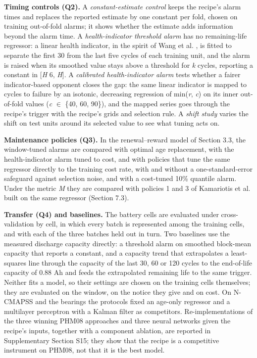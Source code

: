\documentclass[a4paper,fleqn,doubleblind]{cas-dc}
\begin{document}
\textbf{Timing controls (Q2).} A \textit{constant-estimate control} keeps the recipe's alarm times and replaces the reported estimate by one constant per fold, chosen on training out-of-fold alarms; it shows whether the estimate adds information beyond the alarm time. A \textit{health-indicator threshold alarm} has no remaining-life regressor: a linear health indicator, in the spirit of Wang et al. \cite{wang2008}, is fitted to separate the first 30 from the last five cycles of each training unit, and the alarm is raised when its smoothed value stays above a threshold for \textit{k} cycles, reporting a constant in [\textit{H} \textminus{} 6, \textit{H}]. A \textit{calibrated health-indicator alarm} tests whether a fairer indicator-based opponent closes the gap: the same linear indicator is mapped to cycles to failure by an isotonic, decreasing regression of min(\textit{r}, \textit{c}) on its inner out-of-fold values (\textit{c} $\in$ \{40, 60, 90\}), and the mapped series goes through the recipe's trigger with the recipe's grids and selection rule. A \textit{shift study} varies the shift on test units around its selected value to see what tuning acts on.

\textbf{Maintenance policies (Q3).} In the renewal--reward model of Section 3.3, the window-tuned alarms are compared with optimal age replacement, with the health-indicator alarm tuned to cost, and with policies that tune the same regressor directly to the training cost rate, with and without a one-standard-error safeguard against selection noise, and with a cost-tuned 10\% quantile alarm. Under the metric \textit{M} they are compared with policies 1 and 3 of Kamariotis et al. \cite{kamariotis2024} built on the same regressor (Section 7.3).

\textbf{Transfer (Q4) and baselines.} The battery cells are evaluated under cross-validation by cell, in which every batch is represented among the training cells, and with each of the three batches held out in turn. Two baselines use the measured discharge capacity directly: a threshold alarm on smoothed block-mean capacity that reports a constant, and a capacity trend that extrapolates a least-squares line through the capacity of the last 30, 60 or 120 cycles to the end-of-life capacity of 0.88 Ah and feeds the extrapolated remaining life to the same trigger. Neither fits a model, so their settings are chosen on the training cells themselves; they are evaluated on the window, on the notice they give and on cost. On N-CMAPSS and the bearings the protocols fixed an age-only regressor and a multilayer perceptron with a Kalman filter as competitors. Re-implementations of the three winning PHM08 approaches and three neural networks given the recipe's inputs, together with a component ablation, are reported in Supplementary Section S15; they show that the recipe is a competitive instrument on PHM08, not that it is the best model.
\end{document}
